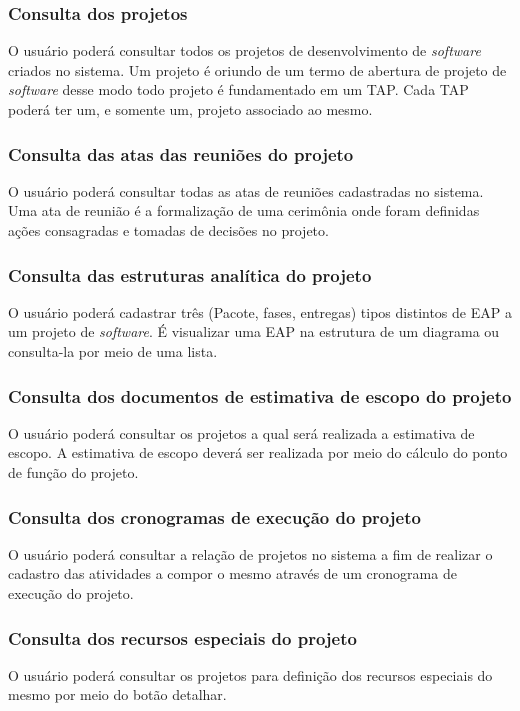 \documentclass{acm_proc_article-sp}
\begin{document}
\subsubsection{Consulta dos projetos}
O usuário poderá consultar todos os projetos de desenvolvimento de \textit{software} criados no sistema. Um projeto é oriundo de um termo de abertura de projeto de \textit{software} desse modo todo projeto é fundamentado em um TAP. Cada TAP poderá ter um, e somente um, projeto associado ao mesmo.

\subsubsection{Consulta das atas das reuniões do projeto}
O usuário poderá consultar todas as atas de reuniões cadastradas no sistema. Uma ata de reunião é a formalização de uma cerimônia onde foram definidas ações consagradas e tomadas de decisões no projeto.

\subsubsection{Consulta das estruturas analítica do projeto}
O usuário poderá cadastrar três (Pacote, fases, entregas) tipos distintos de EAP a um projeto de \textit{software}. É visualizar uma EAP na estrutura de um diagrama ou consulta-la por meio de uma lista. 

\subsubsection{Consulta dos documentos de estimativa de escopo do projeto}
O usuário poderá consultar os projetos a qual será realizada a estimativa de escopo. A estimativa de escopo deverá ser realizada por meio do cálculo do ponto de função do projeto.

\subsubsection{Consulta dos cronogramas de execução do projeto}
O usuário poderá consultar a relação de projetos no sistema a fim de realizar o cadastro das atividades a compor o mesmo através de um cronograma de execução do projeto.

\subsubsection{Consulta dos recursos especiais do projeto}
O usuário poderá consultar os projetos para definição dos recursos especiais do mesmo por meio do botão detalhar.
\end{document}
